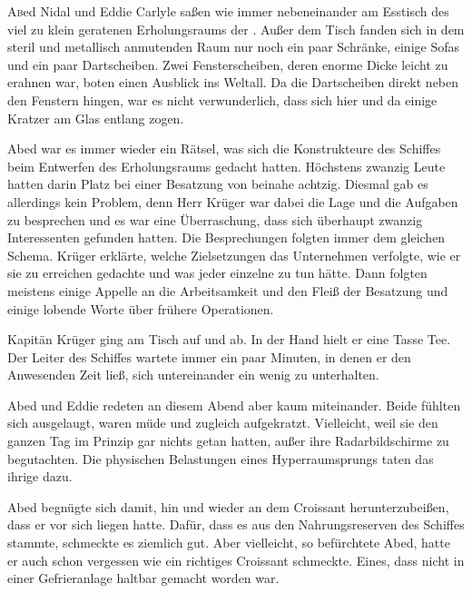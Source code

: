 \lettrine[lines=3]{A}bed Nidal und Eddie Carlyle saßen wie immer nebeneinander am Esstisch des viel zu klein geratenen Erholungsraums der . Außer dem Tisch fanden sich in dem steril und metallisch anmutenden Raum nur noch ein paar Schränke, einige Sofas und ein paar Dartscheiben. Zwei Fensterscheiben, deren enorme Dicke leicht zu erahnen war, boten einen Ausblick ins Weltall. Da die Dartscheiben direkt neben den Fenstern hingen, war es nicht verwunderlich, dass sich hier und da einige Kratzer am Glas entlang zogen.

\par

Abed war es immer wieder ein Rätsel, was sich die Konstrukteure des Schiffes beim Entwerfen des Erholungsraums gedacht hatten. Höchstens zwanzig Leute hatten darin Platz bei einer Besatzung von beinahe achtzig. Diesmal gab es allerdings kein Problem, denn Herr Krüger war dabei die Lage und die Aufgaben zu besprechen und es war eine Überraschung, dass sich überhaupt zwanzig Interessenten gefunden hatten. Die Besprechungen folgten immer dem gleichen Schema. Krüger erklärte, welche Zielsetzungen das Unternehmen verfolgte, wie er sie zu erreichen gedachte und was jeder einzelne zu tun hätte. Dann folgten meistens einige Appelle an die Arbeitsamkeit und den Fleiß der Besatzung und einige lobende Worte über frühere Operationen.

\par

Kapitän Krüger ging am Tisch auf und ab. In der Hand hielt er eine Tasse Tee. Der Leiter des Schiffes wartete immer ein paar Minuten, in denen er den Anwesenden Zeit ließ, sich untereinander ein wenig zu unterhalten.

\par

Abed und Eddie redeten an diesem Abend aber kaum miteinander. Beide fühlten sich ausgelaugt, waren müde und zugleich aufgekratzt. Vielleicht, weil sie den ganzen Tag im Prinzip gar nichts getan hatten, außer ihre Radarbildschirme zu begutachten. Die physischen Belastungen eines Hyperraumsprungs taten das ihrige dazu.

\par

Abed begnügte sich damit, hin und wieder an dem Croissant herunterzubeißen, dass er vor sich liegen hatte. Dafür, dass es aus den Nahrungsreserven des Schiffes stammte, schmeckte es ziemlich gut. Aber vielleicht, so befürchtete Abed, hatte er auch schon vergessen wie ein richtiges Croissant schmeckte. Eines, dass nicht in einer Gefrieranlage haltbar gemacht worden war.

